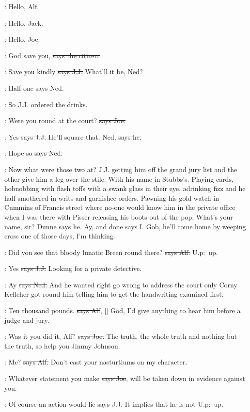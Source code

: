 \lambert:
Hello,
Alf.

\joe:
Hello,
Jack.

\jjom:
Hello,
Joe.

\citizen:
God save you,
\sout{says the citizen.}

\jjom:
Save you kindly
\sout{says J.J.}
What'll it be,
Ned?

\lambert:
Half one
\sout{says Ned.}

\Nq:
So J.J.
ordered the drinks.

\joe:
Were you round at the court?
\sout{says Joe.}

\jjom:
Yes
\sout{says J.J.}
He'll square that,
Ned,
\sout{says he.}

\lambert:
Hope so
\sout{says Ned.}

\Nq:
Now what were those two at?
J.J.
getting him off the grand jury list
and the other give him a leg over the stile.
With his name in Stubbs's.
Playing cards,
hobnobbing with flash toffs with a swank glass in their
eye,
adrinking fizz and he half smothered in writs and garnishee orders.
Pawning his gold watch in Cummins of Francis street where no-one would
know him in the private office when I was there with Pisser releasing his
boots out of the pop.
What's your name,
sir?
Dunne says he.
Ay,
and done
says I.
Gob,
he'll come home by weeping cross one of those days,
I'm
thinking.%

\bergan:
Did you see that bloody lunatic Breen round there?
\sout{says Alf.} U.p:~up.

\jjom:
Yes
\sout{says J.J.}
Looking for a private detective.

\lambert:
Ay
\sout{says Ned.}
And he wanted right go wrong to address the court only
Corny Kelleher got round him telling him to get the handwriting examined
first.

\bergan:
Ten thousand pounds.
\sout{says Alf},
[]
God,
I'd give anything to hear
him before a judge and jury.

\joe:
Was it you did it,
Alf?
\sout{says Joe.}
The truth,
the whole truth and nothing
but the truth,
so help you Jimmy Johnson.

\bergan:
Me?
\sout{says Alf.}
Don't cast your nasturtiums on my character.

\joe:
Whatever statement you make
\sout{says Joe},
will be taken down in evidence
against you.

\jjom:
Of course an action would lie
\sout{says J.J.}
It implies that he is not
U.p:~up.


